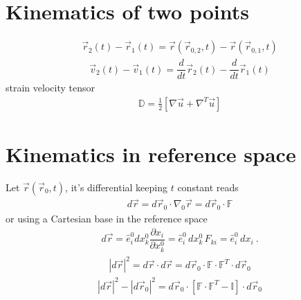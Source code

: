 \documentclass[letterpaper,10pt,english]{jupyterBook}
\begin{document}
\section{Kinematics of two points}
\label{\detokenize{ch/continuum/kinematics:kinematics-of-two-points}}\label{\detokenize{ch/continuum/kinematics:kinematics-two-points}}\begin{equation*}
\begin{split}\vec{r}_2(t) - \vec{r}_1(t) = \vec{r}\left(\vec{r}_{0,2}, t \right) - \vec{r}\left(\vec{r}_{0,1}, t \right)\end{split}
\end{equation*}\begin{equation*}
\begin{split}\vec{v}_2(t) - \vec{v}_1(t) = \dfrac{d}{dt} \vec{r}_2(t) - \dfrac{d}{dt} \vec{r}_1(t)\end{split}
\end{equation*}
\sphinxAtStartPar
strain velocity tensor
\begin{equation}\label{equation:ch/continuum/kinematics:eq:strain-vel-tensor}
\begin{split}\mathbb{D} = \frac{1}{2} \left[ \nabla \vec{u} + \nabla^T \vec{u} \right]\end{split}
\end{equation}

\section{Kinematics in reference space}
\label{\detokenize{ch/continuum/kinematics:kinematics-in-reference-space}}\label{\detokenize{ch/continuum/kinematics:kinematics-reference-space}}
\sphinxAtStartPar
Let \(\vec{r}(\vec{r}_0, t)\), it’s differential \sphinxhyphen{} keeping \(t\) constant \sphinxhyphen{} reads
\begin{equation*}
\begin{split}d \vec{r} = d \vec{r}_0 \cdot \nabla_0 \vec{r} = d \vec{r}_0 \cdot \mathbb{F}\end{split}
\end{equation*}
\sphinxAtStartPar
or using a Cartesian base in the reference space
\begin{equation*}
\begin{split}d \vec{r} = \hat{e}^0_i d x^0_k \dfrac{\partial x_i}{\partial x^0_k}  = \hat{e}^0_i \, d x^0_k \, F_{ki} = \hat{e}^0_i \, d x_i \ .\end{split}
\end{equation*}\begin{equation*}
\begin{split}|d \vec{r}|^2 = d \vec{r} \cdot d \vec{r} = d \vec{r}_0 \cdot \mathbb{F} \cdot \mathbb{F}^T \cdot d \vec{r}_0 \end{split}
\end{equation*}\begin{equation*}
\begin{split}|d \vec{r}|^2 - |d \vec{r}_0|^2 = d \vec{r}_0 \cdot \left[ \mathbb{F} \cdot \mathbb{F}^T - \mathbb{I} \right] \cdot d \vec{r}_0 \end{split}
\end{equation*}
\end{document}
